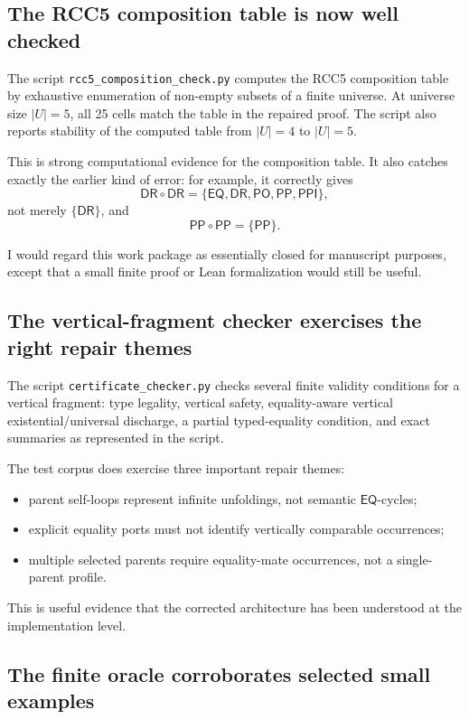 \documentclass[11pt]{article}
\newcommand{\PP}{\mathsf{PP}}
\newcommand{\PPI}{\mathsf{PPI}}
\newcommand{\PO}{\mathsf{PO}}
\newcommand{\DR}{\mathsf{DR}}
\newcommand{\EQ}{\mathsf{EQ}}
\begin{document}
\subsection{The RCC5 composition table is now well checked}

The script \texttt{rcc5\_composition\_check.py} computes the RCC5 composition table by exhaustive enumeration of non-empty subsets of a finite universe.  At universe size \(|U|=5\), all 25 cells match the table in the repaired proof.  The script also reports stability of the computed table from \(|U|=4\) to \(|U|=5\).

This is strong computational evidence for the composition table.  It also catches exactly the earlier kind of error: for example, it correctly gives
\[
\DR\circ\DR=\{\EQ,\DR,\PO,\PP,\PPI\},
\]
not merely \(\{\DR\}\), and
\[
\PP\circ\PP=\{\PP\}.
\]

I would regard this work package as essentially closed for manuscript purposes, except that a small finite proof or Lean formalization would still be useful.

\subsection{The vertical-fragment checker exercises the right repair themes}

The script \texttt{certificate\_checker.py} checks several finite validity conditions for a vertical fragment: type legality, vertical safety, equality-aware vertical existential/universal discharge, a partial typed-equality condition, and exact summaries as represented in the script.

The test corpus does exercise three important repair themes:
\begin{itemize}
\item parent self-loops represent infinite unfoldings, not semantic \(\EQ\)-cycles;
\item explicit equality ports must not identify vertically comparable occurrences;
\item multiple selected parents require equality-mate occurrences, not a single-parent profile.
\end{itemize}

This is useful evidence that the corrected architecture has been understood at the implementation level.

\subsection{The finite oracle corroborates selected small examples}
\end{document}
